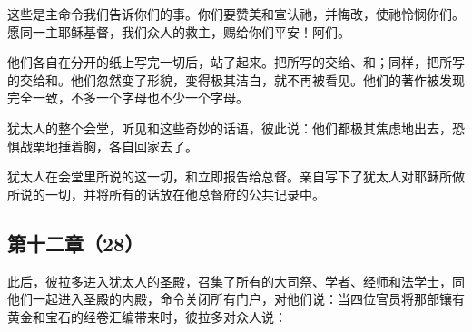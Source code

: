 这些是主命令我们告诉你们的事。你们要赞美和宣认祂，并悔改，使祂怜悯你们。愿同一主耶稣基督，我们众人的救主，赐给你们平安！阿们。\par

他们各自在分开的纸上写完一切后，站了起来。把所写的交给、和；同样，把所写的交给和。他们忽然变了形貌，变得极其洁白，就不再被看见。他们的著作被发现完全一致，不多一个字母也不少一个字母。\par

犹太人的整个会堂，听见和这些奇妙的话语，彼此说：他们都极其焦虑地出去，恐惧战栗地捶着胸，各自回家去了。\par

犹太人在会堂里所说的这一切，和立即报告给总督。亲自写下了犹太人对耶稣所做所说的一切，并将所有的话放在他总督府的公共记录中。\par


\subsection{第十二章（28）}

此后，彼拉多进入犹太人的圣殿，召集了所有的大司祭、学者、经师和法学士，同他们一起进入圣殿的内殿，命令关闭所有门户，对他们说：当四位官员将那部镶有黄金和宝石的经卷汇编带来时，彼拉多对众人说：\par

